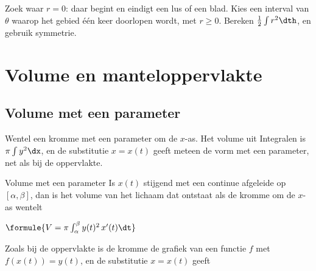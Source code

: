 \begin{werkwijze}
Zoek waar $r = 0$: daar begint en eindigt een lus of een blad. Kies een interval van $\theta$ waarop het gebied één keer doorlopen wordt, met $r \geqslant 0$. Bereken $\tfrac12 \int r^2\dth$, en gebruik symmetrie.
\end{werkwijze}


\begin{oefeningen}
\end{oefeningen}

\section{Volume en manteloppervlakte}

\subsection{Volume met een parameter}

Wentel een kromme met een parameter om de $x$-as. Het volume uit Integralen is $\pi\int y^2\dx$, en de substitutie $x = x(t)$ geeft meteen de vorm met een parameter, net als bij de oppervlakte.

\begin{theorie}
\begin{stelling}{Volume met een parameter}
Is $x(t)$ stijgend met een continue afgeleide op $[\alpha, \beta]$, dan is het volume van het lichaam dat ontstaat als de kromme om de $x$-as wentelt

\vspace{1mm}
\qquad $\formule{V = \pi\int_\alpha^\beta y(t)^2\,x'(t)\dt}$
\end{stelling}

\begin{bewijs}
Zoals bij de oppervlakte is de kromme de grafiek van een functie $f$ met $f(x(t)) = y(t)$, en de substitutie $x = x(t)$ geeft
\end{bewijs}
\end{theorie}

